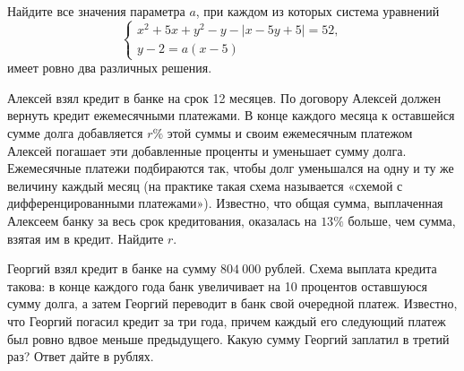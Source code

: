\begin{class}[number=8]
	\begin{listofex}
		\item Найдите все значения параметра \( a \), при каждом из которых система уравнений
		\[ \left\{
		\begin{array}{l}
			x^2+5x+y^2-y-|x-5y+5|=52,\\
			y-2=a(x-5)
		\end{array}
		\right. \]
		имеет ровно два различных решения.
		\item Алексей взял кредит в банке на срок 12 месяцев.
		По договору Алексей должен вернуть кредит ежемесячными платежами.
		В конце каждого месяца к оставшейся сумме долга добавляется \( r\% \) этой суммы и своим ежемесячным платежом Алексей погашает эти добавленные проценты и уменьшает сумму долга.
		Ежемесячные платежи подбираются так, чтобы долг уменьшался на одну и ту же величину каждый месяц (на практике такая схема называется «схемой с дифференцированными платежами»).
		Известно, что общая сумма, выплаченная Алексеем банку за весь срок кредитования, оказалась на \( 13\% \) больше, чем сумма, взятая им в кредит. Найдите \( r \).
		\item Георгий взял кредит в банке на сумму \( 804\:000 \) рублей.
		Схема выплата кредита такова: в конце каждого года банк увеличивает на 10 процентов оставшуюся сумму долга,
		а затем Георгий переводит в банк свой очередной платеж.
		Известно, что Георгий погасил кредит за три года, причем каждый его следующий платеж был ровно вдвое меньше предыдущего.
		Какую сумму Георгий заплатил в третий раз?
		Ответ дайте в рублях.
	\end{listofex}
\end{class}

